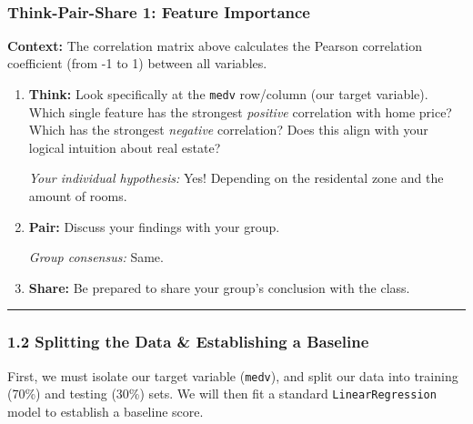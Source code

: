 \documentclass[11pt]{article}
\begin{document}
    \begin{center}
    \end{center}
    { \hspace*{\fill} \\}
    
    \subsubsection{Think-Pair-Share 1: Feature
Importance}\label{think-pair-share-1-feature-importance}

\textbf{Context:} The correlation matrix above calculates the Pearson
correlation coefficient (from -1 to 1) between all variables.

\begin{enumerate}
\def\labelenumi{\arabic{enumi}.}
\item
  \textbf{Think:} Look specifically at the \texttt{medv} row/column (our
  target variable). Which single feature has the strongest
  \emph{positive} correlation with home price? Which has the strongest
  \emph{negative} correlation? Does this align with your logical
  intuition about real estate?

  \emph{Your individual hypothesis:} Yes! Depending on the residental
  zone and the amount of rooms.
\item
  \textbf{Pair:} Discuss your findings with your group.

  \emph{Group consensus:} Same.
\item
  \textbf{Share:} Be prepared to share your group's conclusion with the
  class.
\end{enumerate}

\begin{center}\rule{0.5\linewidth}{0.5pt}\end{center}

    \subsubsection{1.2 Splitting the Data \& Establishing a
Baseline}\label{splitting-the-data-establishing-a-baseline}

First, we must isolate our target variable (\texttt{medv}), and split
our data into training (70\%) and testing (30\%) sets. We will then fit
a standard \texttt{LinearRegression} model to establish a baseline
score.
\end{document}
